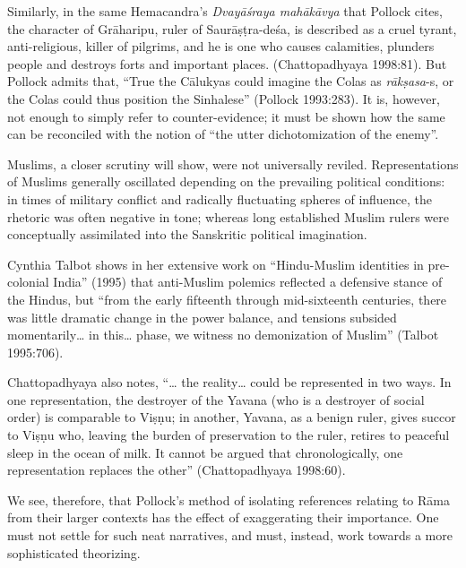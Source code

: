Similarly, in the same Hemacandra’s {\sl Dvayāśraya mahākāvya} that Pollock cites, the character of Grāharipu, ruler of Saurāṣṭra-deśa, is described as a cruel tyrant, anti-religious, killer of pilgrims, and he is one who causes calamities, plunders people and destroys forts and important places. (Chattopadhyaya 1998:81). But Pollock admits that, “True the Cālukyas could imagine the Colas as {\sl rākṣasa}-s, or the Colas could thus position the Sinhalese” (Pollock 1993:283). It is, however, not enough to simply refer to counter-evidence; it must be shown how the same can be reconciled with the notion of “the utter dichotomization of the enemy”. 

Muslims, a closer scrutiny will show, were not universally reviled. Representations of Muslims generally oscillated depending on the prevailing political conditions: in times of military conflict and radically fluctuating spheres of influence, the rhetoric was often negative in tone; whereas long established Muslim rulers were conceptually assimilated into the Sanskritic political imagination. 

Cynthia Talbot shows in her extensive work on “Hindu-Muslim identities in pre-colonial India” (1995) that anti-Muslim polemics reflected a defensive stance of the Hindus, but “from the early fifteenth through mid-sixteenth centuries, there was little dramatic change in the power balance, and tensions subsided momentarily… in this… phase, we witness no demonization of Muslim” (Talbot 1995:706). 

\newpage

Chattopadhyaya also notes, “… the reality… could be represented in two ways. In one representation, the destroyer of the Yavana (who is a destroyer of social order) is comparable to Viṣṇu; in another, Yavana, as a benign ruler, gives succor to Viṣṇu who, leaving the burden of preservation to the ruler, retires to peaceful sleep in the ocean of milk. It cannot be argued that chronologically, one representation replaces the other” (Chattopadhyaya 1998:60). 

We see, therefore, that Pollock’s method of isolating references relating to Rāma from their larger contexts has the effect of exaggerating their importance. One must not settle for such neat narratives, and must, instead, work towards a more sophisticated theorizing. 


